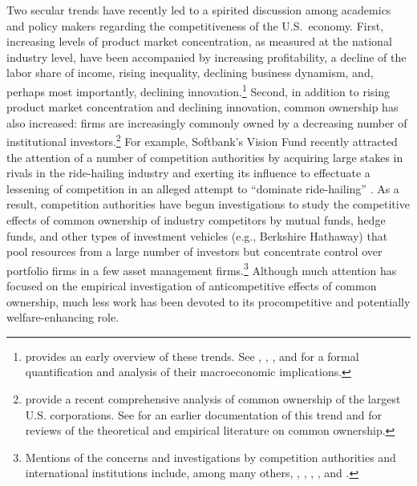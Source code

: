 \documentclass[12pt]{article}
\begin{document}
Two secular trends have recently led to a spirited discussion among academics and policy makers regarding the competitiveness of the U.S.~economy. First, increasing levels of product market concentration, as measured at the national industry level, have been accompanied by increasing profitability, a decline of the labor share of income, rising inequality, declining business dynamism, and, perhaps most importantly, declining innovation.\footnote{\citet{cea2016benefits} provides an early overview of these trends. See \cite{philippon2016investment}, \cite{gutierrez2017declining}, \citet{deloecker2020rise}, and \cite{akcigit2021ten} for a formal quantification and analysis of their macroeconomic implications.}
Second, in addition to rising product market concentration and declining innovation, common ownership has also increased: firms are increasingly commonly owned by a decreasing number of institutional investors.\footnote{\citet{backus2021common} provide a recent comprehensive analysis of common ownership of the largest U.S. corporations. See \cite{azar2012new} for an earlier documentation of this trend and \cite{schmalz2018,schmalz2021} for reviews of the theoretical and empirical literature on common ownership.} For example, Softbank's Vision Fund recently attracted the attention of a number of competition authorities by acquiring large stakes in rivals in the ride-hailing industry and exerting its influence to effectuate a lessening of competition in an alleged attempt to ``dominate ride-hailing'' \citep{economist2018ride}. As a result, competition authorities have begun investigations to study the competitive effects of common ownership of industry competitors by mutual funds, hedge funds, and other types of investment vehicles (e.g., Berkshire Hathaway) that pool resources from a large number of investors but concentrate control over portfolio firms in a few asset management firms.\footnote{Mentions of the concerns and investigations by competition authorities and international institutions include, among many others, \cite{oecd2017common}, \cite{eucomp2017decision}, \cite{ftc2018hearing}, \cite{vestager2018competition}, and \cite{bloomberg2020private}.} 
Although much attention has focused on the empirical investigation of anticompetitive effects of common ownership, much less work has been devoted to its procompetitive and potentially welfare-enhancing role.
\end{document}

